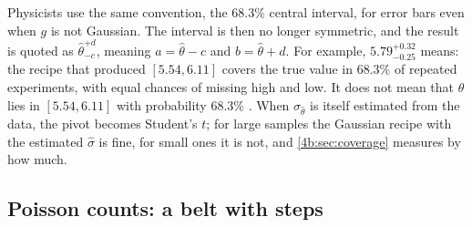 Physicists use the same convention, the $68.3\%$ central interval, for error
bars even when $g$ is not Gaussian. The interval is then no longer symmetric,
and the result is quoted as $\hat\theta^{+d}_{-c}$, meaning $a=\hat\theta-c$ and
$b=\hat\theta+d$. For example, $5.79^{+0.32}_{-0.25}$ means: the recipe that
produced $[5.54,6.11]$ covers the true value in $68.3\%$ of repeated
experiments, with equal chances of missing high and low. It does not mean that $\theta$ lies in $[5.54,6.11]$ with
probability $68.3\%$ . When $\sigma_{\hat\theta}$ is itself
estimated from the data, the pivot becomes Student's $t$; for large samples the
Gaussian recipe with the estimated $\hat\sigma$ is fine, for small ones it is
not, and \cref{4b:sec:coverage} measures by how much.

\subsection{Poisson counts: a belt with steps}
\label{4b:sec:belt-poisson}

